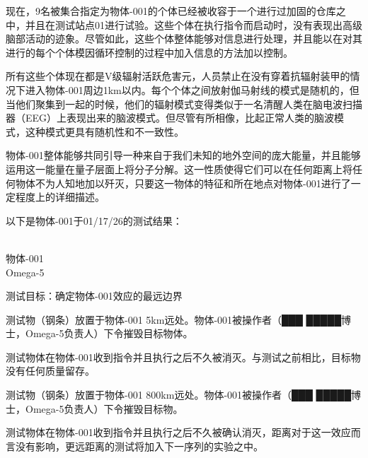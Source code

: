 \begin{scpboxbbwm}





现在，9名被集合指定为物体-001的个体已经被收容于一个进行过加固的仓库之中，并且在测试站点01进行试验。这些个体在执行指令而启动时，没有表现出高级脑部活动的迹象。尽管如此，这些个体整体能够对信息进行处理，并且能以在对其进行的每个个体模因循环控制的过程中加入信息的方法加以控制。

所有这些个体现在都是V级辐射活跃危害元，人员禁止在没有穿着抗辐射装甲的情况下进入物体-001周边1km以内。每个个体之间放射伽马射线的模式是随机的，但当他们聚集到一起的时候，他们的辐射模式变得类似于一名清醒人类在脑电波扫描器（EEG）上表现出来的脑波模式。但尽管有所相像，比起正常人类的脑波模式，这种模式更具有随机性和不一致性。

物体-001整体能够共同引导一种来自于我们未知的地外空间的庞大能量，并且能够运用这一能量在量子层面上将分子分解。这一性质使得它们可以在任何距离上将任何物体不为人知地加以歼灭，只要这一物体的特征和所在地点对物体-001进行了一定程度上的详细描述。

以下是物体-001于01/17/26的测试结果：

\hr

 \\
物体-001 \\
Omega-5

测试目标：确定物体-001效应的最远边界

测试物（钢条）放置于物体-001 5km远处。物体-001被操作者（███ █████博士，Omega-5负责人）下令摧毁目标物体。

测试物体在物体-001收到指令并且执行之后不久被消灭。与测试之前相比，目标物没有任何质量留存。

测试物（钢条）放置于物体-001 800km远处。物体-001被操作者（███ █████博士，Omega-5负责人）下令摧毁目标物。

测试物体在物体-001收到指令并且执行之后不久被确认消灭，距离对于这一效应而言没有影响，更远距离的测试将加入下一序列的实验之中。



\end{scpboxbbwm}
